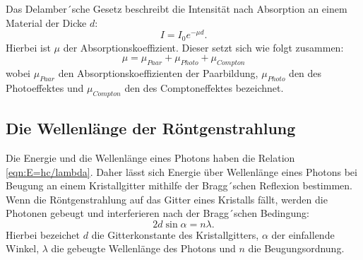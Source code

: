 Das Delamber´sche Gesetz beschreibt die Intensität nach Absorption an einem Material der Dicke $d$:
\begin{equation}
	I = I_0 e^{- \mu d}.
	\label{eqn:intensitätabsorp}
\end{equation}
Hierbei ist $\mu$ der Absorptionskoeffizient. Dieser setzt sich wie folgt zusammen:
\begin{equation*}
	\mu = \mu_{Paar} + \mu_{Photo} + \mu_{Compton}
\end{equation*}
wobei $\mu_{Paar}$ den Absorptionskoeffizienten der Paarbildung, $\mu_{Photo}$ den des Photoeffektes und $\mu_{Compton}$ den des Comptoneffektes bezeichnet.

\subsection{Die Wellenlänge der Röntgenstrahlung}
Die Energie und die Wellenlänge eines Photons haben die Relation \eqref{eqn:E=hc/lambda}. Daher lässt sich Energie über Wellenlänge eines Photons bei Beugung an einem Kristallgitter mithilfe der
Bragg´schen Reflexion bestimmen. Wenn die Röntgenstrahlung auf das Gitter eines Kristalls fällt, werden die Photonen gebeugt und interferieren nach der Bragg´schen Bedingung:
\begin{equation}
	2 d \sin \alpha = n \lambda.
	\label{eqn:(3)}
\end{equation}
Hierbei bezeichet $d$ die Gitterkonstante des Kristallgitters, $\alpha$ der einfallende Winkel, $\lambda$ die gebeugte Wellenlänge des Photons und $n$ die Beugungsordnung.
